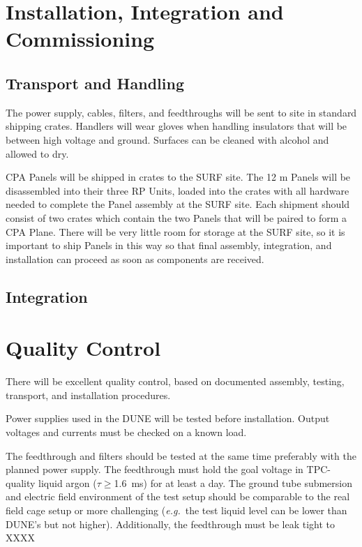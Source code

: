 \section{Installation, Integration and Commissioning}
\label{sec:fddp-hv-install}

\subsection{Transport and Handling}
\label{sec:fddp-hv-install-transport}

The power supply, cables, filters, and feedthroughs will be sent to site in standard shipping crates.  Handlers will wear gloves when handling insulators that will be between high voltage and ground.  Surfaces can be cleaned with alcohol and allowed to dry.

CPA Panels will be shipped in crates to the SURF site.  The 12 m Panels will be disassembled into their three RP Units, loaded into the crates with all hardware needed to complete the Panel assembly at the SURF site.  Each shipment should consist of two crates which contain the two Panels that will be paired to form a CPA Plane.  There will be very little room for storage at the SURF site, so it is important to ship Panels in this way so that final assembly, integration, and installation can proceed as soon as components are received.

\subsection{Integration }
\label{sec:fddp-hv-install-pds-elec}

\section{Quality Control}
There will be excellent quality control, based on documented assembly, testing, transport, and installation procedures.
\label{sec:fddp-hv-qc}

Power supplies used in the DUNE will be tested before installation.  Output voltages and currents must be checked on a known load. 

The feedthrough and filters should be tested at the same time preferably with the planned power supply.  The feedthrough must hold the goal  voltage in TPC-quality liquid argon ($\tau\geq$\SI{1.6}{ms}) for at least a day.  The ground tube submersion and electric field environment of the test setup should be comparable to the real field cage setup or more challenging ({\it e.g.}\ the test liquid level can be lower than DUNE's but not higher).  Additionally, the feedthrough must be leak tight to XXXX 

